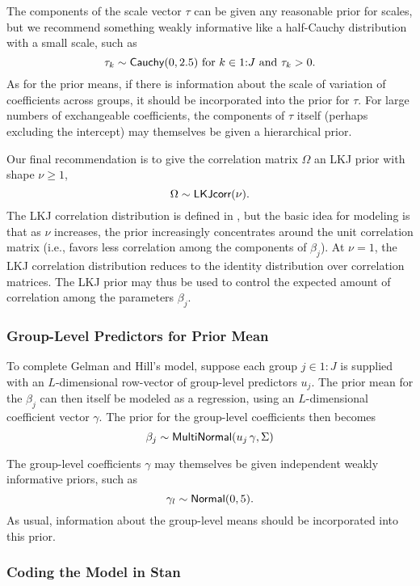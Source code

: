 The components of the scale vector $\tau$ can be given any reasonable
prior for scales, but we recommend something weakly informative like a
half-Cauchy distribution with a small scale, such as
\[
\tau_k \sim \mbox{\sf Cauchy}(0, 2.5) 
\mbox{ for } k \in 1{:}J \mbox{ and  } \tau_k > 0.
\]
As for the prior means, if there is information about the scale of
variation of coefficients across groups, it should be incorporated
into the prior for $\tau$.  For large numbers of exchangeable
coefficients, the components of $\tau$ itself (perhaps excluding the
intercept) may themselves be given a hierarchical prior.

Our final recommendation is to give the correlation matrix $\Omega$ an
LKJ prior with shape $\nu \geq 1$,
\[
\Omega \sim \mbox{\sf LKJcorr}(\nu).
\]
The LKJ correlation distribution is defined in
, but the basic idea for modeling is that
as $\nu$ increases, the prior increasingly concentrates around the
unit correlation matrix (i.e., favors less correlation among the
components of $\beta_{j}$).  At $\nu = 1$, the LKJ correlation
distribution reduces to the identity distribution over correlation
matrices.  The LKJ prior may thus be used to control the expected
amount of correlation among the parameters $\beta_j$.

\subsubsection{Group-Level Predictors for Prior Mean}

To complete Gelman and Hill's model, suppose each group $j \in 1{:}J$
is supplied with an $L$-dimensional row-vector of group-level
predictors $u_j$.  The prior mean for the $\beta_j$ can then itself be
modeled as a regression, using an $L$-dimensional coefficient vector
$\gamma$.  The prior for the group-level coefficients then becomes
\[
\beta_j \sim \mbox{\sf MultiNormal}(u_j \, \gamma, \Sigma)
\]

The group-level coefficients $\gamma$ may themselves be given
independent weakly informative priors, such as
\[
\gamma_l \sim \mbox{\sf Normal}(0,5).
\] 
As usual, information about the group-level means should be
incorporated into this prior.


\subsubsection{Coding the Model in Stan}

